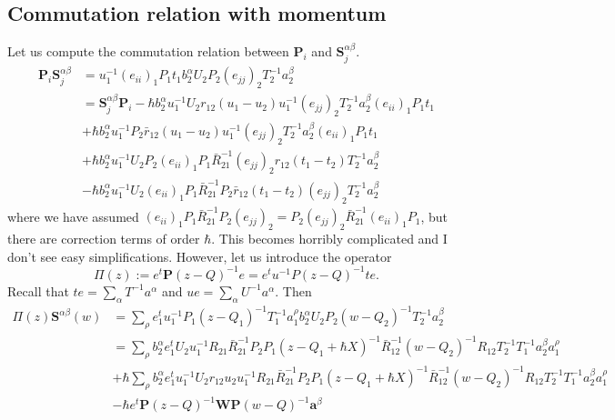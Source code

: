 \documentclass[11pt]{report}
\theoremstyle{definition}
\theoremstyle{remark}
\theoremstyle{remark}
\begin{document}
\subsection{Commutation relation with momentum}

Let us compute the commutation relation between $\mathbf{P}_i$ and $\mathbf{S}_j^{\alpha\beta}$.
\begin{align*}
\mathbf{P}_i \mathbf{S}_j^{\alpha\beta}
&= u_1^{-1} (e_{ii})_1 P_1 t_1 b_2^\alpha U_2 P_2 (e_{jj})_2 T_2^{-1} a_2^\beta \\
&= \mathbf{S}_j^{\alpha\beta} \mathbf{P}_i - \hbar b_2^\alpha u_1^{-1} U_2 r_{12} (u_1-u_2) u_1^{-1} (e_{jj})_2 T_2^{-1} a_2^\beta (e_{ii})_1 P_1 t_1 \\
&+ \hbar b_2^\alpha u_1^{-1} P_2 \bar r_{12}(u_1-u_2) u_1^{-1} (e_{jj})_2 T_2^{-1} a_2^\beta (e_{ii})_1 P_1 t_1 \\
&+ \hbar b_2^\alpha u_1^{-1} U_2 P_2 (e_{ii})_1 P_1 \bar R_{21}^{-1} (e_{jj})_2 r_{12} (t_1-t_2) T_2^{-1} a_2^\beta \\
&- \hbar b_2^\alpha u_1^{-1} U_2 (e_{ii})_1 P_1 \bar R_{21}^{-1} P_2 \bar r_{12} (t_1-t_2) (e_{jj})_2 T_2^{-1} a_2^\beta
\end{align*}
where we have assumed $(e_{ii})_1 P_1 \bar R_{21}^{-1} P_2 (e_{jj})_2 = P_2 (e_{jj})_2 \bar R_{21}^{-1} (e_{ii})_1 P_1$, but there are correction terms of order $\hbar$. This becomes horribly complicated and I don't see easy simplifications. However, let us introduce the operator
\begin{equation*}
\Pi(z) := e^t \mathbf{P} (z-Q)^{-1} e = e^t u^{-1} P (z-Q)^{-1} t e.
\end{equation*}
Recall that $te = \sum_\alpha T^{-1} a^\alpha$ and $ue = \sum_\alpha U^{-1} a^\alpha$. Then
\begin{align*}
\Pi(z) \mathbf{S}^{\alpha\beta}(w)
&= \sum_\rho e_1^t u_1^{-1} P_1 (z-Q_1)^{-1} T_1^{-1} a_1^\rho b_2^\alpha U_2 P_2 (w-Q_2)^{-1} T_2^{-1} a_2^\beta \\
&= \sum_\rho b_2^\alpha e_1^t U_2 u_1^{-1} R_{21} \bar R_{21}^{-1} P_2 P_1 (z-Q_1+\hbar X)^{-1} \bar R_{12}^{-1} (w-Q_2)^{-1} R_{12} T_2^{-1} T_1^{-1} a_2^\beta a_1^\rho \\
&+ \hbar \sum_\rho b_2^\alpha e_1^t u_1^{-1} U_2 r_{12} u_2 u_1^{-1} R_{21} \bar R_{21}^{-1} P_2 P_1 (z-Q_1+\hbar X)^{-1} \bar R_{12}^{-1} (w-Q_2)^{-1} R_{12} T_2^{-1} T_1^{-1} a_2^\beta a_1^\rho \\
&- \hbar e^t \mathbf{P} (z-Q)^{-1} \mathbf{W} \mathbf{P} (w-Q)^{-1} \mathbf{a}^\beta
\end{align*}
\end{document}
